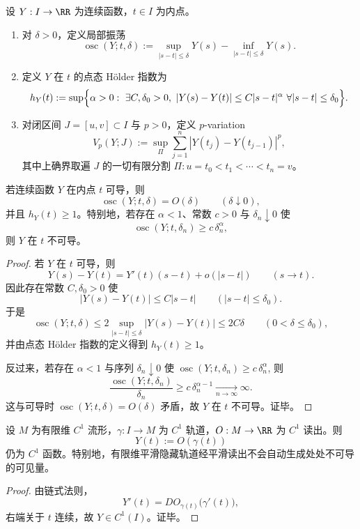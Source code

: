 \begin{definition}\label{def:groupoid-zeckendorf-visible-roughness-certificates}
设 \(Y:I\to\RR\) 为连续函数，\(t\in I\) 为内点。
\begin{enumerate}
  \item 对 \(\delta>0\)，定义局部振荡
  \[
  \operatorname{osc}(Y;t,\delta):=
  \sup_{|s-t|\le \delta}Y(s)-\inf_{|s-t|\le \delta}Y(s).
  \]
  \item 定义 \(Y\) 在 \(t\) 的点态 H\"older 指数为
  \[
  h_Y(t):=
  \sup\Bigl\{
  \alpha>0:\ \exists C,\delta_0>0,\ 
  |Y(s)-Y(t)|\le C|s-t|^\alpha
  \ \forall |s-t|\le \delta_0
  \Bigr\}.
  \]
  \item 对闭区间 \(J=[u,v]\subset I\) 与 \(p>0\)，定义 \(p\)-variation
  \[
  V_p(Y;J):=
  \sup_{\Pi}
  \sum_{j=1}^{n}
  |Y(t_j)-Y(t_{j-1})|^p,
  \]
  其中上确界取遍 \(J\) 的一切有限分割
  \(
  \Pi:u=t_0<t_1<\cdots<t_n=v
  \)。
\end{enumerate}
\end{definition}

\begin{proposition}\label{prop:groupoid-zeckendorf-visible-holder-nondifferentiability}
若连续函数 \(Y\) 在内点 \(t\) 可导，则
\[
\operatorname{osc}(Y;t,\delta)=O(\delta)
\qquad (\delta\downarrow 0),
\]
并且 \(h_Y(t)\ge 1\)。特别地，若存在 \(\alpha<1\)、常数 \(c>0\) 与 \(\delta_n\downarrow 0\) 使
\[
\operatorname{osc}(Y;t,\delta_n)\ge c\,\delta_n^\alpha,
\]
则 \(Y\) 在 \(t\) 不可导。
\end{proposition}
\begin{proof}
若 \(Y\) 在 \(t\) 可导，则
\[
Y(s)-Y(t)=Y'(t)(s-t)+o(|s-t|)
\qquad (s\to t).
\]
因此存在常数 \(C,\delta_0>0\) 使
\[
|Y(s)-Y(t)|\le C|s-t|
\qquad (|s-t|\le \delta_0).
\]
于是
\[
\operatorname{osc}(Y;t,\delta)
\le
2\sup_{|s-t|\le \delta}|Y(s)-Y(t)|
\le 2C\delta
\qquad (0<\delta\le \delta_0),
\]
并由点态 H\"older 指数的定义得到 \(h_Y(t)\ge 1\)。

反过来，若存在 \(\alpha<1\) 与序列 \(\delta_n\downarrow 0\) 使
\(
\operatorname{osc}(Y;t,\delta_n)\ge c\,\delta_n^\alpha
\),
则
\[
\frac{\operatorname{osc}(Y;t,\delta_n)}{\delta_n}
\ge
c\,\delta_n^{\alpha-1}\xrightarrow[n\to\infty]{}\infty.
\]
这与可导时 \(\operatorname{osc}(Y;t,\delta)=O(\delta)\) 矛盾，故 \(Y\) 在 \(t\) 不可导。证毕。
\end{proof}

\begin{proposition}[平滑投影的不可导边界]\label{prop:groupoid-zeckendorf-smooth-projection-nogo}
设 \(M\) 为有限维 \(C^1\) 流形，\(\gamma:I\to M\) 为 \(C^1\) 轨道，\(O:M\to\RR\) 为 \(C^1\) 读出。则
\[
Y(t):=O(\gamma(t))
\]
仍为 \(C^1\) 函数。特别地，有限维平滑隐藏轨道经平滑读出不会自动生成处处不可导的可见量。
\end{proposition}
\begin{proof}
由链式法则，
\[
Y'(t)=DO_{\gamma(t)}\bigl(\gamma'(t)\bigr),
\]
右端关于 \(t\) 连续，故 \(Y\in C^1(I)\)。证毕。
\end{proof}

